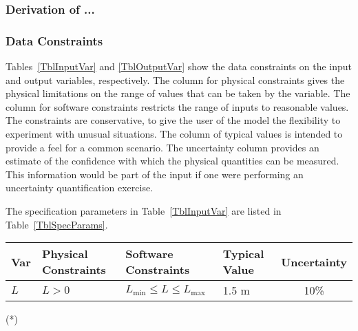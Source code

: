 \documentclass[12pt]{article}
\begin{document}

\subsubsection*{Derivation of ...}


\subsubsection{Data Constraints} \label{sec_DataConstraints}    

Tables~\ref{TblInputVar} and \ref{TblOutputVar} show the data constraints on the
input and output variables, respectively.  The column for physical constraints gives
the physical limitations on the range of values that can be taken by the
variable.  The column for software constraints restricts the range of inputs to
reasonable values.  The constraints are conservative, to give the user of the
model the flexibility to experiment with unusual situations.  The column of
typical values is intended to provide a feel for a common scenario.  The
uncertainty column provides an estimate of the confidence with which the
physical quantities can be measured.  This information would be part of the
input if one were performing an uncertainty quantification exercise.

The specification parameters in Table~\ref{TblInputVar} are listed in
Table~\ref{TblSpecParams}.

\begin{table}[!h]
  \caption{Input Variables} \label{TblInputVar}
  \renewcommand{\arraystretch}{1.2}
\noindent \begin{longtable*}{l l l l c} 
  \toprule
  \textbf{Var} & \textbf{Physical Constraints} & \textbf{Software Constraints} &
                             \textbf{Typical Value} & \textbf{Uncertainty}\\
  \midrule 
  $L$ & $L > 0$ & $L_{\text{min}} \leq L \leq L_{\text{max}}$ & 1.5 \si[per-mode=symbol] {\metre} & 10\%
  \\
  \bottomrule
\end{longtable*}
\end{table}

\noindent 
\begin{description}
\item[(*)] 
\end{description}
\end{document}
